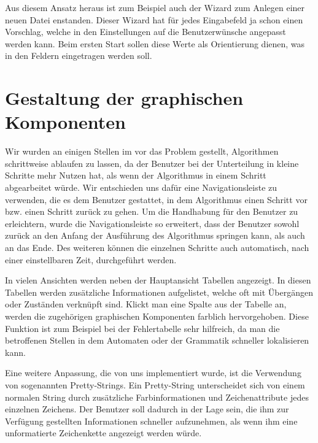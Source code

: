 Aus diesem Ansatz heraus ist zum Beispiel auch der Wizard zum Anlegen einer
neuen Datei enstanden. Dieser Wizard hat für jedes Eingabefeld ja schon einen
Vorschlag, welche in den Einstellungen auf die Benutzerwünsche angepasst werden
kann. Beim ersten Start sollen diese Werte als Orientierung dienen, was in den
Feldern eingetragen werden soll.
\vspace{10pt}


\section{Gestaltung der graphischen Komponenten}\label{GUIDesign}

Wir wurden an einigen Stellen im \gtitool vor das Problem gestellt, Algorithmen
schrittweise ablaufen zu lassen, da der Benutzer bei der Unterteilung in kleine
Schritte mehr Nutzen hat, als wenn der Algorithmus in einem Schritt abgearbeitet würde.
Wir entschieden uns dafür eine Navigationsleiste zu verwenden, die es dem
Benutzer gestattet, in dem Algorithmus einen Schritt vor bzw. einen Schritt
zurück zu gehen. Um die Handhabung für den Benutzer zu erleichtern, wurde die
Navigationsleiste so erweitert, dass der Benutzer sowohl zurück an den Anfang der
Ausführung des Algorithmus springen kann, als auch an das Ende. Des weiteren
können die einzelnen Schritte auch automatisch, nach einer einstellbaren Zeit,
durchgeführt werden.\vspace{10pt}

In vielen Ansichten werden neben der Hauptansicht Tabellen angezeigt. In
diesen Tabellen werden zusätzliche Informationen aufgelistet,
welche oft mit Übergängen oder Zuständen verknüpft sind. Klickt man
eine Spalte aus der Tabelle an, werden die zugehörigen graphischen
Komponenten farblich hervorgehoben. Diese Funktion ist zum Beispiel
bei der Fehlertabelle sehr hilfreich, da man die betroffenen
Stellen in dem Automaten oder der Grammatik schneller lokalisieren
kann.\vspace{10pt}

Eine weitere Anpassung, die von uns implementiert wurde, ist die  Verwendung von
sogenannten Pretty-Strings. Ein Pretty-String unterscheidet sich von einem
normalen String durch zu\-sätz\-liche Farbinformationen und Zeichenattribute
jedes einzelnen Zeichens. Der Benutzer soll dadurch in der Lage sein, die ihm
zur Verfügung gestellten Informationen schneller aufzunehmen, als wenn ihm eine
unformatierte Zeichenkette angezeigt werden würde.\vspace{10pt}



